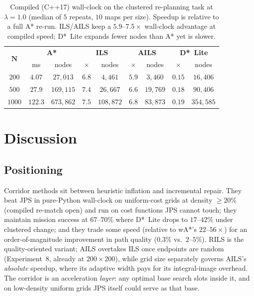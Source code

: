 \documentclass[preprint,12pt,authoryear]{elsarticle}
\begin{document}
\begin{table}[!htbp]
\centering
\caption{Compiled (C++17) wall-clock on the clustered re-planning task at $\lambda = 1.0$ (median of $5$ repeats, $10$ maps per size). Speedup is relative to a full A* re-run. ILS/AILS keep a $5.9$--$7.5\times$ wall-clock advantage at compiled speed; D*~Lite expands fewer nodes than A* yet is slower.}
\label{tab:exp14_cpp}
\begin{tabular}{ccccccccc}
\toprule
\multirow{2}{*}{$\boldsymbol{N}$} & \multicolumn{2}{c}{\textbf{A*}} & \multicolumn{2}{c}{\textbf{ILS}} & \multicolumn{2}{c}{\textbf{AILS}} & \multicolumn{2}{c}{\textbf{D*~Lite}} \\
 & ms & nodes & $\times$ & nodes & $\times$ & nodes & $\times$ & nodes \\
\midrule
$200$  & $4.07$   & $27{,}013$  & $6.8$ & $4{,}461$   & $5.9$ & $3{,}460$   & $0.15$ & $16{,}406$ \\
$500$  & $27.9$   & $169{,}115$ & $7.4$ & $26{,}667$  & $6.6$ & $19{,}769$  & $0.18$ & $90{,}406$ \\
$1000$ & $122.3$  & $673{,}862$ & $7.5$ & $108{,}872$ & $6.8$ & $83{,}873$  & $0.19$ & $354{,}585$ \\
\bottomrule
\end{tabular}
\end{table}

\section{Discussion}\label{sec:discussion}

\subsection{Positioning}

Corridor methods sit between heuristic inflation and incremental repair. They beat JPS in pure-Python wall-clock on uniform-cost grids at density $\geq 20\%$ (compiled re-match open) and run on cost functions JPS cannot touch; they maintain mission success at $67$--$70\%$ where D*~Lite drops to $17$--$42\%$ under clustered change; and they trade some speed (relative to wA*'s $22$--$56\times$) for an order-of-magnitude improvement in path quality ($0.3\%$ vs.\ $2$--$5\%$). RILS is the quality-oriented variant; AILS overtakes ILS once endpoints are random (Experiment~8, already at $200\times200$), while grid size separately governs AILS's \emph{absolute} speedup, where its adaptive width pays for its integral-image overhead. The corridor is an acceleration \emph{layer}: any optimal base search slots inside it, and on low-density uniform grids JPS itself could serve as that base.
\end{document}
